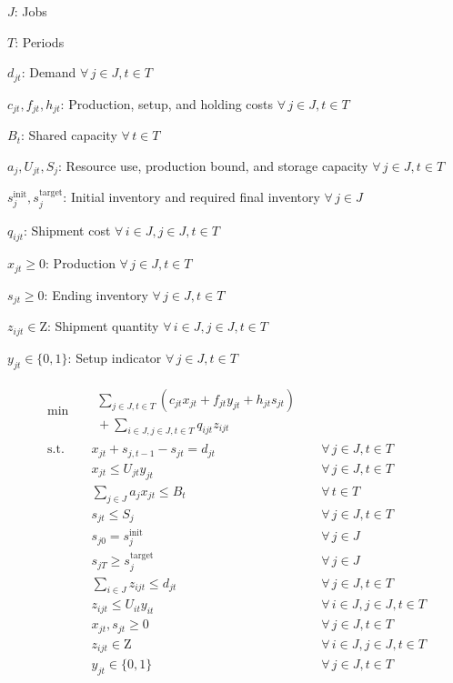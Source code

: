 
\noindent $J$: Jobs\par
\noindent $T$: Periods\par
\noindent $d_{jt}$: Demand $\forall\,j\in J,t\in T$\par
\noindent $c_{jt},f_{jt},h_{jt}$: Production, setup, and holding costs $\forall\,j\in J,t\in T$\par
\noindent $B_t$: Shared capacity $\forall\,t\in T$\par
\noindent $a_j,U_{jt},S_j$: Resource use, production bound, and storage capacity $\forall\,j\in J,t\in T$\par
\noindent $s_j^{\mathrm{init}},s_j^{\mathrm{target}}$: Initial inventory and required final inventory $\forall\,j\in J$\par
\noindent $q_{ijt}$: Shipment cost $\forall\,i\in J,j\in J,t\in T$\par
\noindent $x_{jt}\geq0$: Production $\forall\,j\in J,t\in T$\par
\noindent $s_{jt}\geq0$: Ending inventory $\forall\,j\in J,t\in T$\par
\noindent $z_{ijt}\in\mathrm Z$: Shipment quantity $\forall\,i\in J,j\in J,t\in T$\par
\noindent $y_{jt}\in\{0,1\}$: Setup indicator $\forall\,j\in J,t\in T$\par
\begin{align}
  \min\quad &\begin{aligned}\sum_{j\in J,t\in T}(c_{jt}x_{jt}+f_{jt}y_{jt}+h_{jt}s_{jt})\\{}+\sum_{i\in J,j\in J,t\in T}q_{ijt}z_{ijt}\end{aligned} && \label{planning:0} \\
  \text{s.t.}\quad &x_{jt}+s_{j,t-1}-s_{jt}=d_{jt} &&\forall\,j\in J,t\in T \label{planning:1} \\
  &x_{jt}\leq U_{jt}y_{jt} &&\forall\,j\in J,t\in T \label{planning:2} \\
  &\sum_{j\in J}a_j x_{jt}\leq B_t &&\forall\,t\in T \label{planning:3} \\
  &s_{jt}\leq S_j &&\forall\,j\in J,t\in T \label{planning:4} \\
  &s_{j0}=s_j^{\mathrm{init}} &&\forall\,j\in J \label{planning:5} \\
  &s_{jT}\geq s_j^{\mathrm{target}} &&\forall\,j\in J \label{planning:6} \\
  &\sum_{i\in J}z_{ijt}\leq d_{jt} &&\forall\,j\in J,t\in T \label{planning:7} \\
  &z_{ijt}\leq U_{it}y_{it} &&\forall\,i\in J,j\in J,t\in T \label{planning:8} \\
  &x_{jt},s_{jt}\geq0 &&\forall\,j\in J,t\in T \label{planning:9} \\
  &z_{ijt}\in\mathrm Z &&\forall\,i\in J,j\in J,t\in T \label{planning:10} \\
  &y_{jt}\in\{0,1\} &&\forall\,j\in J,t\in T \label{planning:11}
\end{align}

